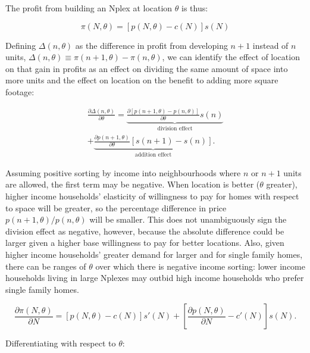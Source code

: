 \documentclass[12pt]{article}
\begin{document}
The profit from building an Nplex at location $\theta$ is thus:

\begin{equation}
	\pi(N,\theta) = \left[p(N,\theta)-c(N)\right]s(N)
\end{equation}

Defining $\Delta(n,\theta)$ as the difference in profit from developing $n+1$ instead of $n$ units, $\Delta(n,\theta) \equiv \pi(n+1,\theta)-\pi(n,\theta)$, we can identify the effect of location on that gain in profits as an effect on dividing the same amount of space into more units and the effect on location on the benefit to adding more square footage:

\begin{equation}
	\label{eq:dDelta}
	\begin{split}
		\frac{\partial \Delta(n,\theta)}{\partial \theta} = \underbrace{\frac{\partial\left[p\left(n+1,\theta\right)-p\left(n,\theta\right)\right]}{\partial \theta}s(n)}_{\text{division effect}} \\ + \underbrace{\frac{\partial p\left(n+1,\theta\right)}{\partial \theta}\left[s(n+1)-s(n)\right]}_{\text{addition effect}}.
	\end{split}
\end{equation}

Assuming positive sorting by income into neighbourhoods where $n$ or $n+1$ units are allowed, the first term may be negative. When location is better ($\theta$ greater), higher income households' elasticity of willingness to pay for homes with respect to space will be greater, so the percentage difference in price $p(n+1,\theta)/p(n,\theta)$ will be smaller. This does not unambiguously sign the division effect as negative, however, because the absolute difference could be larger given a higher base willingness to pay for better locations. Also, given higher income households' greater demand for larger and for single family homes, there can be ranges of $\theta$ over which there is negative income sorting: lower income households living in large Nplexes may outbid high income households who prefer single family homes.



\begin{equation}
	\frac{\partial \pi(N,\theta)}{\partial N} = \left[p(N,\theta)-c(N)\right]s'(N) + \left[\frac{\partial p(N,\theta)}{\partial N}-c'(N)\right]s(N).
\end{equation}

Differentiating with respect to $\theta$:
\end{document}
